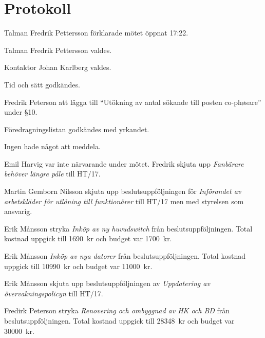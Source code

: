 \documentclass[10pt]{article}
\def\mo{Fredrik Pettersson}
\def\ms{Johan Karlberg}
\begin{document}
\section*{Protokoll}
\begin{paragrafer}
Talman {\mo} förklarade mötet öppnat 17:22.

Talman {\mo} valdes.

Kontaktor {\ms} valdes.

Tid och sätt godkändes.

\valavj

\ingaadj

Fredrik Peterson \ypa att lägga till ``Utökning av antal sökande till posten co-phøsare'' under \S10.

Föredragningslistan godkändes med yrkandet.


Ingen hade något att meddela.

Emil Harvig var inte närvarande under mötet. Fredrik \ypa skjuta upp \emph{Fanbärare behöver längre påle} till HT/17.

\Mbaby

Martin Gemborn Nilsson \ypa skjuta upp beslutsuppföljningen för \emph{Införandet av arbetskläder för utlåning till funktionärer} till HT/17 men med styrelsen som ansvarig.

\Mbaby

Erik Månsson \ypa stryka \emph{Inköp av ny huvudswitch} från beslutsuppföljningen. Total kostnad uppgick till \SI{1690}{kr} och budget var \SI{1700}{kr}.

\Mbaby

Erik Månsson \ypa \emph{Inköp av nya datorer} från beslutsuppföljningen. Total kostnad uppgick till \SI{10990}{kr} och budget var \SI{11000}{kr}.

\Mbaby

Erik Månsson \ypa skjuta upp beslutsuppföljningen av \emph{Uppdatering av övervakningspolicyn} till HT/17.

\Mbaby

Fredirk Peterson \ypa stryka \emph{Renovering och ombyggnad av HK och BD} från beslutsuppföljningen. Total kostnad uppgick till \SI{28348}{kr} och budget var \SI{30000}{kr}.


\end{paragrafer}
\end{document}
